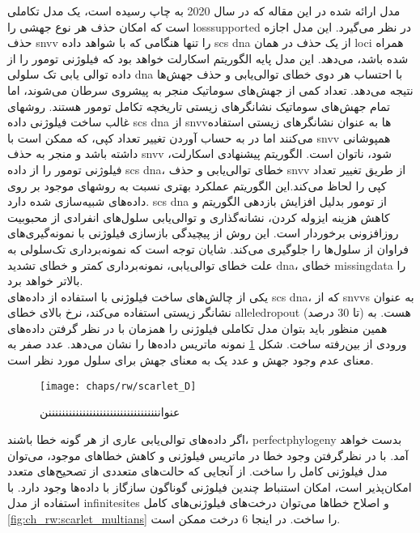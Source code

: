 مدل ارائه شده در این مقاله که در سال 2020 به چاپ رسیده است، یک مدل تکاملی است که امکان حذف هر نوع جهشی را  \gls{losssupported} در نظر می‌گیرد.  این مدل اجازه حذف \gls{snvv} را تنها هنگامی که با شواهد داده \gls{scs} \gls{dna} از یک حذف در همان \gls{loci} همراه شده باشد، می‌دهد. این مدل پایه الگوریتم اسکارلت خواهد بود که فیلوژنی تومور را از داده توالی یابی تک سلولی \gls{dna} با احتساب هر دوی خطای توالی‌یابی و حذف جهش‌ها نتیجه می‌دهد. 
تعداد کمی از جهش‌های سوماتیک منجر به پیشروی سرطان می‌شوند، اما تمام جهش‌های سوماتیک نشانگرهای زیستی تاریخچه تکامل تومور هستند. روشهای غالب ساخت فیلوژنی داده \gls{scs} \gls{dna} از \gls{snvv}ها به عنوان نشانگرهای زیستی استفاده می‌کنند اما در به حساب آوردن تغییر تعداد کپی، که ممکن است با \gls{snvv} همپوشانی داشته باشد و منجر به حذف \gls{snvv} شود، ناتوان است. 
الگوریتم پیشنهادی اسکارلت، فیلوژنی تومور را از داده \gls{scs} \gls{dna}، خطای توالی‌یابی و حذف \gls{snvv} از طریق تغییر تعداد کپی را لحاظ می‌کند.این الگوریتم عملکرد بهتری نسبت به روشهای موجود بر روی داده‌های شبیه‌سازی شده دارد. \gls{scs} \gls{dna} از تومور بدلیل افزایش بازدهی الگوریتم و کاهش هزینه ایزوله کردن، نشانه‌گذاری و توالی‌یابی سلول‌های انفرادی از محبوبیت روزافزونی برخوردار است. این روش از پیچیدگی بازسازی فیلوژنی با نمونه‌گیری‌های فراوان از سلول‌ها را جلوگیری می‌کند. شایان توجه است که نمونه‌برداری تک‌سلولی به علت خطای توالی‌یابی، نمونه‌برداری کمتر و خطای تشدید \gls{dna}، خطای \gls{missingdata} را بالاتر خواهد برد. \\
یکی از چالش‌های ساخت فیلوژنی با استفاده از داده‌های \gls{scs} \gls{dna}، که از \glspl{snvv} به عنوان نشانگر زیستی استفاده می‌کند، نرخ بالای خطای  \gls{alleledropout} (تا 30 درصد) هست. به همین منظور باید بتوان مدل تکاملی فیلوژنی را همزمان با در نظر گرفتن داده‌های ورودی از بین‌رفته ساخت. شکل \ref{fig:ch_rw:scarlet_D} نمونه ماتریس داده‌ها را نشان می‌دهد. عدد صفر به معنای عدم وجود جهش و عدد یک به معنای جهش برای سلول مورد نظر است.

\begin{figure}[!ht]
	\centerline{\texttt{[image: chaps/rw/scarlet\_D]}}
	\caption{عنوانننننننننننننننننننننننننننننننننن}
	\label{fig:ch_rw:scarlet_D}
\end{figure}


اگر داده‌های توالی‌یابی عاری از هر گونه خطا باشند، \gls{perfectphylogeny} بدست خواهد آمد. با در نظرگرفتن وجود خطا در ماتریس فیلوژنی و کاهش خطاهای موجود، می‌توان مدل فیلوژنی کامل را ساخت. از آنجایی که حالت‌های متعددی از تصحیح‌های متعدد امکان‌پذیر است، امکان استنباط چندین فیلوژنی گوناگون سازگاز با داده‌ها وجود دارد. با استفاده از مدل \gls{infinitesites} و اصلاح خطاها می‌توان درخت‌های فیلوژنی‌های کامل \ref{fig:ch_rw:scarlet_multians} را ساخت. در اینجا 6 درخت ممکن است.


